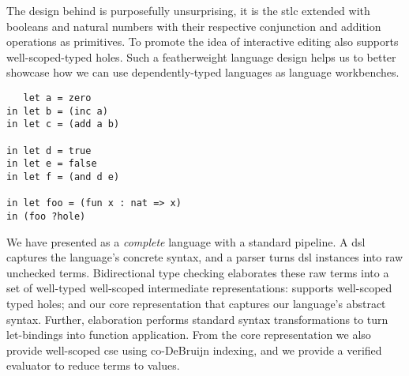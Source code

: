 

The design behind \Velo{} is purposefully unsurprising, it is the \ac{stlc} extended with booleans and natural numbers with their respective conjunction and addition operations as primitives.
To promote the idea of interactive editing \Velo{} also supports well-scoped-typed holes.
Such a featherweight language design helps us to better showcase how we can use dependently-typed languages as language workbenches.

\begin{Verbatim}
   let a = zero
in let b = (inc a)
in let c = (add a b)

in let d = true
in let e = false
in let f = (and d e)

in let foo = (fun x : nat => x)
in (foo ?hole)

\end{Verbatim}

We have presented \Velo{} as a \emph{complete} language with a standard pipeline.
A \ac{dsl} captures the language's concrete syntax, and a parser turns \ac{dsl} instances into raw unchecked terms.
Bidirectional type checking elaborates these raw terms into a set of well-typed well-scoped intermediate representations:  supports well-scoped typed holes; and  our core representation that captures our language's abstract syntax.
Further, elaboration performs standard syntax transformations to turn let-bindings into function application.
From the core representation we also provide well-scoped \ac{cse} using co-DeBruijn indexing, and we provide a verified evaluator to reduce terms to values.



